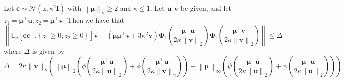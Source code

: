 \documentclass[10pt,a4paper]{amsart}
\def\bfI{{\mathbf{I}}}\def\bfJ{{\mathbf{J}}}\def\bfK{{\mathbf{K}}}\def\bfL{{\mathbf{L}}}
\def\bfc{{\mathbf{c}}}\def\bfd{{\mathbf{d}}}
\def\bfu{{\mathbf{u}}}\def\bfv{{\mathbf{v}}}\def\bfw{{\mathbf{w}}}\def\bfx{{\mathbf{x}}}
\def\bfv{{\mathbf{v}}}\def\bfw{{\mathbf{w}}}\def\bfx{{\mathbf{x}}}
\newcommand{\norm}[1]{\left\|#1\right\|}
\newcommand{\paren}[1]{\left(#1\right)}
\providecommand{\E}{\mathbb{E}}
\begin{document}
\begin{lemma}
    \label{lem:exp_grad_1st_prod}
    Let $\bm{c}\sim\mathcal{N}\paren{\bm{\mu},\kappa^2\bfI}$ with $\norm{\bm{\mu}}_2\geq 2$ and $\kappa \leq 1$. Let $\bfu,\bfv$ be given, and let $z_1 = \bm{\mu}^\top\bfu, z_2 = \bm{\mu}^\top\bfv$. Then we have that
    \[
        \norm{\E_{\bfc}\left[\bfc\bfc^\top\mathbb{I}\left\{z_1\geq 0;z_2\geq 0\right\}\right]\bfv - \paren{\bm{\mu}\bm{\mu}^\top\bfv + 3\kappa^2\bfv}\bm{\Phi}_1\paren{\frac{\bm{\mu^\top\bfu}}{2\kappa\norm{\bfv}_2}}\bm{\Phi}_1\paren{\frac{\bm{\mu^\top\bfv}}{2\kappa\norm{\bfv}_2}}} \leq \Delta
    \]
    where $\Delta$ is given by
    \[
        \Delta = 2\kappa\norm{\bfv}_2\paren{\norm{\bm{\mu}}_2\paren{\phi\paren{\frac{\bm{\mu^\top\bfu}}{2\kappa\norm{\bfu}_2}} + \phi\paren{\frac{\bm{\mu^\top\bfu}}{2\kappa\norm{\bfv}_2}}} +\norm{\bm{\mu}}_{\infty}\paren{\psi\paren{\frac{\bm{\mu^\top\bfu}}{2\kappa\norm{\bfu}_2}} + \psi\paren{\frac{\bm{\mu^\top\bfu}}{2\kappa\norm{\bfu}_2}}}}
    \]
\end{lemma}
\end{document}
